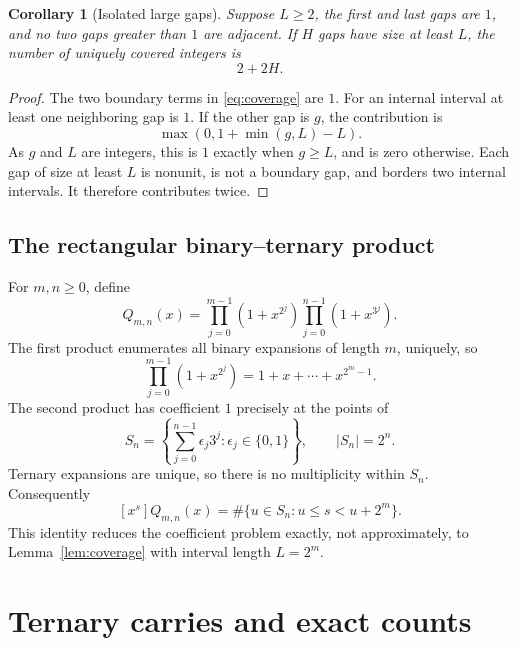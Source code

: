 \documentclass[11pt,letterpaper]{article}
\numberwithin{equation}{section}
\newtheorem{corollary}[theorem]{Corollary}
\theoremstyle{definition}
\theoremstyle{remark}
\begin{document}
\begin{corollary}[Isolated large gaps]\label{cor:isolated}
Suppose $L\ge2$, the first and last gaps are $1$, and no two gaps greater
than $1$ are adjacent. If $H$ gaps have size at least $L$, the number of
uniquely covered integers is
\begin{equation}\label{eq:isolated}
 2+2H.
\end{equation}
\end{corollary}
\begin{proof}
The two boundary terms in \eqref{eq:coverage} are $1$. For an internal
interval at least one neighboring gap is $1$. If the other gap is $g$, the
contribution is
\[
 \max(0,1+\min(g,L)-L).
\]
As $g$ and $L$ are integers, this is $1$ exactly when $g\ge L$, and is zero
otherwise. Each gap of size at least $L$ is nonunit, is not a boundary gap,
and borders two internal intervals. It therefore contributes twice.
\end{proof}

\subsection{The rectangular binary--ternary product}
For $m,n\ge0$, define
\begin{equation}\label{eq:rectangle}
 Q_{m,n}(x)=
 \prod_{j=0}^{m-1}(1+x^{2^j})
 \prod_{j=0}^{n-1}(1+x^{3^j}).
\end{equation}
The first product enumerates all binary expansions of length $m$, uniquely,
so
\begin{equation}\label{eq:densefactor}
 \prod_{j=0}^{m-1}(1+x^{2^j})=1+x+\cdots+x^{2^m-1}.
\end{equation}
The second product has coefficient $1$ precisely at the points of
\begin{equation}\label{eq:ternarysupport}
 S_n=\left\{\sum_{j=0}^{n-1}\epsilon_j3^j:
             \epsilon_j\in\{0,1\}\right\},
 \qquad |S_n|=2^n.
\end{equation}
Ternary expansions are unique, so there is no multiplicity within $S_n$.
Consequently
\begin{equation}\label{eq:coverageinterpretation}
 [x^s]Q_{m,n}(x)=\#\{u\in S_n:u\le s<u+2^m\}.
\end{equation}
This identity reduces the coefficient problem exactly, not approximately,
to Lemma~\ref{lem:coverage} with interval length $L=2^m$.

\section{Ternary carries and exact counts}\label{sec:exact}
\end{document}
